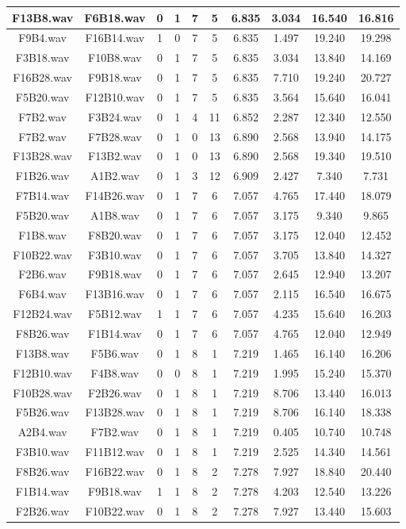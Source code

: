 \documentclass[11pt,a4paper,twoside]{book}
\begin{document}
\begin{longtable}[c]{|c|c|c|c|c|c|c|c|c|c|}
F13B8.wav&F6B18.wav&0&1&7&5&6.835&3.034&16.540&16.816\\ \hline
F9B4.wav&F16B14.wav&1&0&7&5&6.835&1.497&19.240&19.298\\ \hline
F3B18.wav&F10B8.wav&0&1&7&5&6.835&3.034&13.840&14.169\\ \hline
F16B28.wav&F9B18.wav&0&1&7&5&6.835&7.710&19.240&20.727\\ \hline
F5B20.wav&F12B10.wav&0&1&7&5&6.835&3.564&15.640&16.041\\ \hline
F7B2.wav&F3B24.wav&0&1&4&11&6.852&2.287&12.340&12.550\\ \hline
F7B2.wav&F7B28.wav&0&1&0&13&6.890&2.568&13.940&14.175\\ \hline
F13B28.wav&F13B2.wav&0&1&0&13&6.890&2.568&19.340&19.510\\ \hline
F1B26.wav&A1B2.wav&0&1&3&12&6.909&2.427&7.340&7.731\\ \hline
F7B14.wav&F14B26.wav&0&1&7&6&7.057&4.765&17.440&18.079\\ \hline
F5B20.wav&A1B8.wav&0&1&7&6&7.057&3.175&9.340&9.865\\ \hline
F1B8.wav&F8B20.wav&0&1&7&6&7.057&3.175&12.040&12.452\\ \hline
F10B22.wav&F3B10.wav&0&1&7&6&7.057&3.705&13.840&14.327\\ \hline
F2B6.wav&F9B18.wav&0&1&7&6&7.057&2.645&12.940&13.207\\ \hline
F6B4.wav&F13B16.wav&0&1&7&6&7.057&2.115&16.540&16.675\\ \hline
F12B24.wav&F5B12.wav&1&1&7&6&7.057&4.235&15.640&16.203\\ \hline
F8B26.wav&F1B14.wav&0&1&7&6&7.057&4.765&12.040&12.949\\ \hline
F13B8.wav&F5B6.wav&0&1&8&1&7.219&1.465&16.140&16.206\\ \hline
F12B10.wav&F4B8.wav&0&0&8&1&7.219&1.995&15.240&15.370\\ \hline
F10B28.wav&F2B26.wav&0&1&8&1&7.219&8.706&13.440&16.013\\ \hline
F5B26.wav&F13B28.wav&0&1&8&1&7.219&8.706&16.140&18.338\\ \hline
A2B4.wav&F7B2.wav&0&1&8&1&7.219&0.405&10.740&10.748\\ \hline
F3B10.wav&F11B12.wav&0&1&8&1&7.219&2.525&14.340&14.561\\ \hline
F8B26.wav&F16B22.wav&0&1&8&2&7.278&7.927&18.840&20.440\\ \hline
F1B14.wav&F9B18.wav&1&1&8&2&7.278&4.203&12.540&13.226\\ \hline
F2B26.wav&F10B22.wav&0&1&8&2&7.278&7.927&13.440&15.603\\ \hline

\end{longtable}
\end{document}

